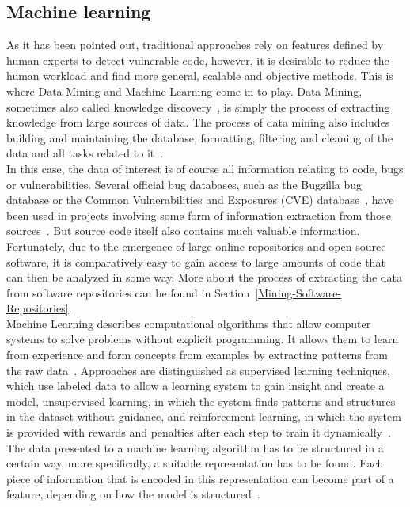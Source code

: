 \documentclass[
a4paper,
pagesize,
pdftex,
12pt,
twoside, %
BCOR=5mm, %
ngerman,
fleqn,
final,
]{scrartcl}
\begin{document}
	\subsection{Machine learning} 
	As it has been pointed out, traditional approaches rely on features defined by human experts to detect vulnerable code, however, it is desirable to reduce the human workload and find more general, scalable and objective methods. This is where Data Mining and Machine Learning come in to play. Data Mining, sometimes also called knowledge discovery~\cite{Mitchell.1999}, is simply the process of extracting knowledge from large sources of data. The process of data mining also includes building and maintaining the database, formatting, filtering and cleaning of the data and all tasks related to it~\cite{Mitchell.1999}.\\
	In this case, the data of interest is of course all information relating to code, bugs or vulnerabilities. Several official bug databases, such as the Bugzilla bug database or the Common Vulnerabilities and Exposures (CVE) database~\cite{CVE}, have been used in projects involving some form of information extraction from those sources~\cite{Wijayasekara.2012}. But source code itself also contains much valuable information. Fortunately, due to the emergence of large online repositories and open-source software, it is comparatively easy to gain access to large amounts of code that can then be analyzed in some way. More about the process of extracting the data from software repositories can be found in Section~\ref{Mining-Software-Repositories}.\\
	Machine Learning describes computational algorithms that allow computer systems to solve problems without explicit programming. It allows them to learn from experience and form concepts from examples by extracting patterns from the raw data~\cite{Goodfellow.2016}. Approaches are distinguished as supervised learning techniques, which use labeled data to allow a learning system to gain insight and create a model, unsupervised learning, in which the system finds patterns and structures in the dataset without guidance, and reinforcement learning, in which the system is provided with rewards and penalties after each step to train it dynamically~\cite{Mitchell.1997}.\\
	The data presented to a machine learning algorithm has to be structured in a certain way, more specifically, a suitable representation has to be found. Each piece of information that is encoded in this representation can become part of a feature, depending on how the model is structured~\cite{Goodfellow.2016}. 
\end{document}
